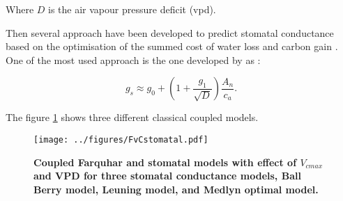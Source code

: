 \documentclass[a4paper,11pt]{article}
\begin{document}
Where $D$ is the air vapour pressure deficit (vpd).

Then several approach have been developed to predict stomatal conductance based on the optimisation of the summed cost of water loss and carbon gain \citep{Medlyn-2002,Prentice-2014,Wolf-2016,Sperry-2017}. One of the most used approach is the one developed by \citet{Medlyn-2011} as :

\begin{equation}
\label{eq:gs-Medlyn}
g_s \approx g_0 + (1 + \frac{g_1}{\sqrt{D}}) \frac{A_n }{c_a}.
\end{equation}



The figure \ref{fig:photo_stomat} shows three different classical coupled models.




\begin{figure}[ht]
\centering
\texttt{[image: ../figures/FvCstomatal.pdf]}
\caption{\textbf{Coupled Farquhar and stomatal models with effect of
    $V_{cmax}$ and VPD for three stomatal conductance models, Ball
    Berry model, Leuning model, and Medlyn optimal model.}
\label{fig:photo_stomat}}
\end{figure}
\end{document}
